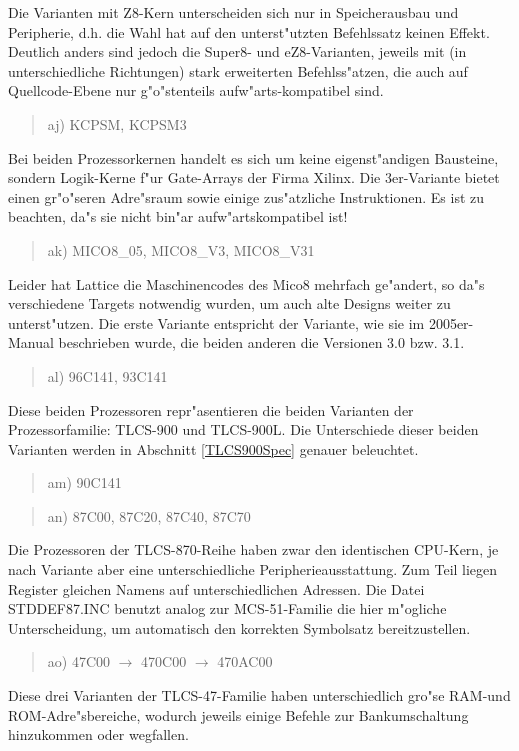 \documentclass[12pt,a4paper,twoside]{report}
\begin{document}
Die Varianten mit Z8-Kern unterscheiden sich nur in
Speicherausbau und Peripherie, d.h. die Wahl hat auf den
unterst"utzten Befehlssatz keinen Effekt.  Deutlich anders sind
jedoch die Super8- und eZ8-Varianten, jeweils mit (in unterschiedliche
Richtungen) stark erweiterten Befehlss"atzen, die auch auf Quellcode-Ebene
nur g"o"stenteils aufw"arts-kompatibel sind.
\begin{quote}
aj) KCPSM, KCPSM3
\end{quote}
Bei beiden Prozessorkernen handelt es sich um keine eigenst"andigen
Bausteine, sondern Logik-Kerne f"ur Gate-Arrays der Firma Xilinx.  Die
3er-Variante bietet einen gr"o"seren Adre"sraum sowie einige zus"atzliche
Instruktionen.  Es ist zu beachten, da"s sie nicht bin"ar
aufw"artskompatibel ist!
\begin{quote}
ak) MICO8\_05, MICO8\_V3, MICO8\_V31
\end{quote}
Leider hat Lattice die Maschinencodes des Mico8 mehrfach ge"andert, so
da"s verschiedene Targets notwendig wurden, um auch alte Designs weiter
zu unterst"utzen.  Die erste Variante entspricht der Variante, wie sie
im 2005er-Manual beschrieben wurde, die beiden anderen die Versionen 3.0
bzw. 3.1.
\begin{quote}
al) 96C141, 93C141
\end{quote}
Diese beiden Prozessoren repr"asentieren die beiden Varianten der
Prozessorfamilie: TLCS-900 und TLCS-900L.  Die Unterschiede dieser beiden
Varianten werden in Abschnitt \ref{TLCS900Spec} genauer beleuchtet.
\begin{quote}
am) 90C141
\end{quote}
\begin{quote}
an) 87C00, 87C20, 87C40, 87C70
\end{quote}
Die Prozessoren der TLCS-870-Reihe haben zwar den identischen CPU-Kern, je
nach Variante aber eine unterschiedliche Peripherieausstattung.  Zum
Teil liegen Register gleichen Namens auf unterschiedlichen Adressen.
Die Datei STDDEF87.INC benutzt analog zur MCS-51-Familie die hier
m"ogliche Unterscheidung, um automatisch den korrekten Symbolsatz
bereitzustellen.
\begin{quote}
ao) 47C00 $\rightarrow$ 470C00 $\rightarrow$ 470AC00
\end{quote}
Diese drei Varianten der TLCS-47-Familie haben unterschiedlich gro"se
RAM-und ROM-Adre"sbereiche, wodurch jeweils einige Befehle zur
Bankumschaltung hinzukommen oder wegfallen.
\end{document}
